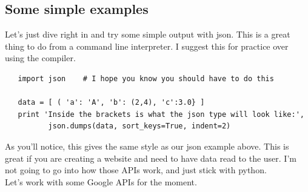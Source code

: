 \documentclass[11pt]{article}   %
\begin{document}
\subsection*{Some simple examples}
Let's just dive right in and try some simple output with json.  This is a great thing to do from a command line interpreter.  I suggest this for practice over using the compiler.
\begin{tcolorbox}
   \begin{lstlisting}
   import json    # I hope you know you should have to do this

   data = [ ( 'a': 'A', 'b': (2,4), 'c':3.0} ]
   print 'Inside the brackets is what the json type will look like:', 
          json.dumps(data, sort_keys=True, indent=2)
   \end{lstlisting}
\end{tcolorbox}
As you'll notice, this gives the same style as our json example above.  This is great if you are creating a website and need to have data read to the user.  I'm not going to go into how those APIs work, and just stick with python.
\\
Let's work with some Google APIs for the moment.
\end{document}
